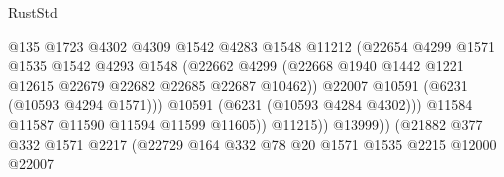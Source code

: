 \begin{lexlean}{RustStd}
\begin{coremodule}
{{                                          @135
                                          @1723
                                          @4302
                                          @4309
                                          @1542
                                          @4283
                                          @1548
                                          @11212
                                          (@22654
                                            @4299
                                            @1571
                                            @1535
                                            @1542
                                            @4293
                                            @1548
                                            (@22662
                                              @4299
                                              (@22668
                                                @1940
                                                @1442
                                                @1221
                                                @12615
                                                @22679
                                                @22682
                                                @22685
                                                @22687
                                                @10462))
                                            @22007
                                            @10591
                                            (@6231 (@10593 @4294 @1571)))
                                          @10591
                                          (@6231 (@10593 @4284 @4302)))
                                        @11584
                                        @11587
                                        @11590
                                        @11594
                                        @11599
                                        @11605))
                                    @11215))
                                @13999))
                            (@21882
                              @377
                              @332
                              @1571
                              @2217
                              (@22729
                                @164
                                @332
                                @78
                                @20
                                @1571
                                @1535
                                @2215
                                @12000
                                @22007
}}
\end{coremodule}
\end{lexlean}
